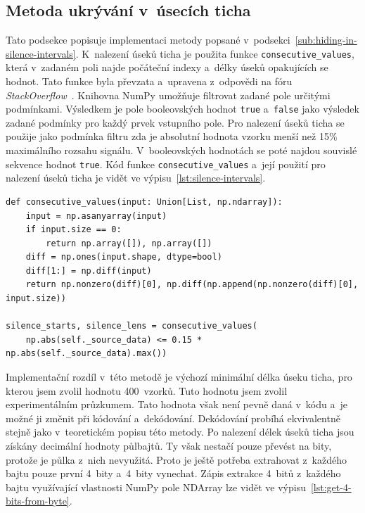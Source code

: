 \subsection*{Metoda ukrývání v~úsecích ticha}
\label{sub:hiding-in-silence-intervals-implementation}

Tato podsekce popisuje implementaci metody popsané
v~podsekci~\ref{sub:hiding-in-silence-intervals}. K~nalezení úseků ticha je
použita funkce \texttt{consecutive\_values}, která v~zadaném poli najde
počáteční indexy a~délky úseků opakujících se hodnot. Tato funkce byla převzata
a~upravena z~odpovědi na fóru
\textit{StackOverflow}~\cite{ConsecutiveValuesStackOverflow}. Knihovna NumPy
umožňuje filtrovat zadané pole určitými podmínkami. Výsledkem je pole
booleovských hodnot \texttt{true} a~\texttt{false} jako výsledek zadané
podmínky pro každý prvek vstupního pole. Pro nalezení úseků ticha se použije
jako podmínka filtru zda je absolutní hodnota vzorku menší než 15\% maximálního
rozsahu signálu. V~booleovských hodnotách se poté najdou souvislé sekvence
hodnot \texttt{true}. Kód funkce \texttt{consecutive\_values} a~její použití
pro nalezení úseků ticha je vidět ve výpisu~\ref{lst:silence-intervals}.

\begin{lstlisting}[language=PythonPlus, label={lst:silence-intervals},
caption={Nalezení indexů a~délek úseků ticha.}]
def consecutive_values(input: Union[List, np.ndarray]):
    input = np.asanyarray(input)
    if input.size == 0:
        return np.array([]), np.array([])
    diff = np.ones(input.shape, dtype=bool)
    diff[1:] = np.diff(input)
    return np.nonzero(diff)[0], np.diff(np.append(np.nonzero(diff)[0], input.size))

silence_starts, silence_lens = consecutive_values(
    np.abs(self._source_data) <= 0.15 * np.abs(self._source_data).max())
\end{lstlisting}

Implementační rozdíl v~této metodě je výchozí minimální délka úseku ticha, pro
kterou jsem zvolil hodnotu 400~vzorků. Tuto hodnotu jsem zvolil experimentálním
průzkumem. Tato hodnota však není pevně daná v~kódu a~je možné ji změnit při
kódování a~dekódování. Dekódování probíhá ekvivalentně stejně jako
v~teoretickém popisu této metody. Po nalezení délek úseků ticha jsou získány
decimální hodnoty půlbajtů. Ty však nestačí pouze převést na bity, protože je
půlka z~nich nevyužitá. Proto je ještě potřeba extrahovat z~každého bajtu pouze
první 4~bity a~4~bity vynechat. Zápis extrakce 4~bitů z~každého bajtu
využívající vlastnosti NumPy pole NDArray lze vidět ve
výpisu~\ref{lst:get-4-bits-from-byte}.


